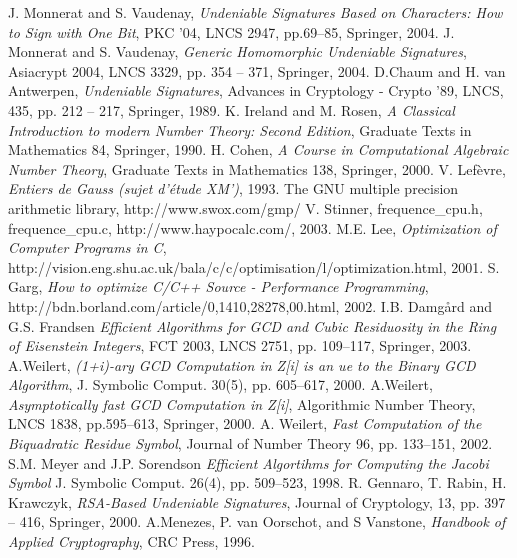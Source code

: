 \documentclass[a4paper, 11pt]{article}
\begin{document}
 
 \begin{thebibliography}{20} 
  J. Monnerat and S. Vaudenay, \emph{Undeniable Signatures Based on Characters: 
     How to Sign with One Bit}, PKC '04, LNCS {2947}, pp.69--85, Springer, 2004. 
  J. Monnerat and S. Vaudenay, \emph{Generic Homomorphic Undeniable Signatures}, Asiacrypt 2004, LNCS 3329, pp. 354 -- 371, Springer, 2004. 
  D.Chaum and H. van Antwerpen, \emph{Undeniable Signatures}, Advances in Cryptology - Crypto '89, LNCS, 435, pp. 212 -- 217, Springer, 1989. 
  K. Ireland and M. Rosen, \emph{A Classical Introduction to modern Number Theory: 
     Second Edition}, Graduate Texts in Mathematics {84}, Springer, 1990. 
  H. Cohen, \emph{A Course in Computational Algebraic Number Theory}, Graduate Texts in Mathematics 138, Springer, 2000. 
  V. Lef\`evre, \emph{Entiers de Gauss (sujet d'\'etude XM')}, 1993. 
  The GNU multiple precision arithmetic library, http://www.swox.com/gmp/ 
  V. Stinner, {\ttfamily frequence\_cpu.h, frequence\_cpu.c\normalfont}, http://www.haypocalc.com/, 2003. 
  M.E. Lee, \emph{Optimization of Computer Programs in C}, http://vision.eng.shu.ac.uk/bala/c/c/optimisation/l/optimization.html, 2001. 
  S. Garg, \emph{How to optimize C/C++ Source - Performance Programming}, 
 http://bdn.borland.com/article/0,1410,28278,00.html, 2002. 
  I.B. Damg\aa rd and G.S. Frandsen \emph{Efficient Algorithms for GCD and Cubic Residuosity in the Ring of Eisenstein Integers}, FCT 2003, LNCS {2751}, pp. 109--117, Springer, 2003. 
  A.Weilert, \emph{(1+i)-ary GCD Computation in Z[i] is an 
 ue to the Binary GCD Algorithm}, J. Symbolic  Comput. {30}(5), pp. 605--617, 2000. 
  A.Weilert, \emph{Asymptotically fast GCD Computation in Z[i]}, Algorithmic Number Theory, LNCS {1838}, pp.595--613, Springer, 2000. 
  A. Weilert, \emph{Fast Computation of the Biquadratic Residue Symbol}, Journal of Number Theory {96}, pp. 133--151, 2002. 
  S.M. Meyer and J.P. Sorendson \emph{Efficient Algortihms for Computing the Jacobi Symbol} J. Symbolic Comput. 26(4), pp. 509--523, 1998. 
  R. Gennaro, T. Rabin, H. Krawczyk, \emph{RSA-Based Undeniable Signatures}, Journal of Cryptology, 13, pp. 397 -- 416, Springer, 2000. 
  A.Menezes, P. van Oorschot, and S Vanstone, \emph{Handbook of Applied Cryptography}, CRC Press, 1996. 
 
 \end{thebibliography} 
 \newpage
 
\end{document}
